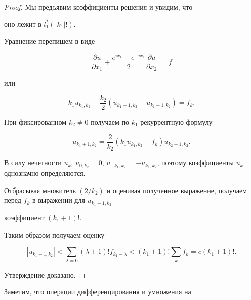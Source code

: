 \begin{proof} Мы предъявим  коэффициенты  решения и увидим, что

оно лежит в $l_1^* (|k_1| !)$. 

Уравнение перепишем в виде

$$

\frac {\partial u}{\partial x_1} + \frac {e^{i x_1} - e^{- i x_1}}2

\frac {\partial u}{\partial x_2} \ =\tilde f

$$

или

\begin{equation}

k_1 u_{k_1, k_2} + \frac {k_2}2 \left ( u_{k_1 -1, k_2} - u_{k_1 + 1, k_2}

\right ) = f_k.

\label{bur(1.3)}

\end{equation}



При фиксированном $k_2 \not= 0$ получаем по $k_1$ рекуррентную формулу

$$

u_{k_1 + 1, k_2} = \frac 2{k_2} \left ( k_1 u_{k_1, k_2} - f_k \right )

u_{k_2 - 1, k_2}.

$$

В силу нечетности $u_k$, $u_{0, k_2} = 0$, $u_{- k_1, k_2} = - u_{k_1,

k_2}$, поэтому коэффициенты $u_k$ однозначно определяются. 

Отбрасывая множитель $(2 / k_2)$ и оценивая полученное выражение, получаем перед $f_k$ в выражении для $u_{k_1 + 1, k_2}$

коэффициент $(k_1 + 1) !$. 

Таким образом получаем оценку

$$

|u_{k_1 + 1, k_2}| < \sum_{\lambda  = 0} (\lambda + 1) ! f_{k_1 - \lambda}

< (k_1 + 1) ! \sum_k f_k = c (k_1 + 1) !.

$$

Утверждение доказано. \hfill \end{proof}



\smallskip



Заметим, что операции дифференцирования и умножения на

